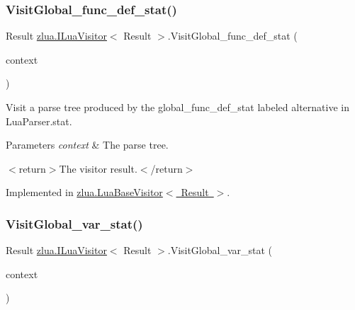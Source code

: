 \subsubsection{\texorpdfstring{Visit\+Global\+\_\+func\+\_\+def\+\_\+stat()}{VisitGlobal\_func\_def\_stat()}}
{\footnotesize\ttfamily Result \mbox{\hyperlink{interfacezlua_1_1_i_lua_visitor}{zlua.\+I\+Lua\+Visitor}}$<$ Result $>$.Visit\+Global\+\_\+func\+\_\+def\+\_\+stat (\begin{DoxyParamCaption}\item[{\mbox{[}\+Not\+Null\mbox{]} \mbox{\hyperlink{classzlua_1_1_lua_parser_1_1_global__func__def__stat_context}{Lua\+Parser.\+Global\+\_\+func\+\_\+def\+\_\+stat\+Context}}}]{context }\end{DoxyParamCaption})}



Visit a parse tree produced by the {\ttfamily global\+\_\+func\+\_\+def\+\_\+stat} labeled alternative in Lua\+Parser.\+stat. 


\begin{DoxyParams}{Parameters}
{\em context} & The parse tree.\\
\hline
\end{DoxyParams}
$<$return$>$The visitor result.$<$/return$>$ 

Implemented in \mbox{\hyperlink{classzlua_1_1_lua_base_visitor_a24c128425bc45cc59eea8e463fead320}{zlua.\+Lua\+Base\+Visitor$<$ Result $>$}}.

\mbox{\label{interfacezlua_1_1_i_lua_visitor_a6a56d5d3378a075a2ac40720cf317954}} 
\subsubsection{\texorpdfstring{Visit\+Global\+\_\+var\+\_\+stat()}{VisitGlobal\_var\_stat()}}
{\footnotesize\ttfamily Result \mbox{\hyperlink{interfacezlua_1_1_i_lua_visitor}{zlua.\+I\+Lua\+Visitor}}$<$ Result $>$.Visit\+Global\+\_\+var\+\_\+stat (\begin{DoxyParamCaption}\item[{\mbox{[}\+Not\+Null\mbox{]} \mbox{\hyperlink{classzlua_1_1_lua_parser_1_1_global__var__stat_context}{Lua\+Parser.\+Global\+\_\+var\+\_\+stat\+Context}}}]{context }\end{DoxyParamCaption})}



